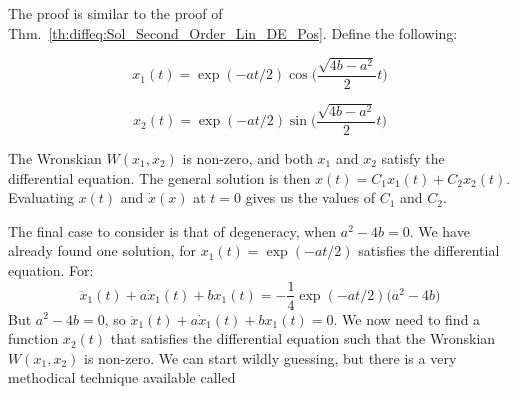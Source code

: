             \begin{bproof}
                The proof is similar to the proof of
                Thm.~\ref{th:diffeq:Sol_Second_Order_Lin_DE_Pos}.
                Define the following:
                \par
                \vspace{-1ex}
                \begin{minipage}{0.49\textwidth}
                    \begin{equation*}
                        x_{1}(t)=\exp(-at/2)
                        \cos\Big(\frac{\sqrt{4b-a^{2}}}{2}t\Big)
                    \end{equation*}
                \end{minipage}
                \hfill
                \begin{minipage}{0.49\textwidth}
                    \begin{equation*}
                        x_{2}(t)=\exp(-at/2)
                        \sin\Big(\frac{\sqrt{4b-a^{2}}}{2}t\Big)
                    \end{equation*}
                \end{minipage}
                \par\hfill\par
                The Wronskian $W(x_{1},x_{2})$ is non-zero, and
                both $x_{1}$ and $x_{2}$ satisfy the
                differential equation. The general solution is then
                $x(t)=C_{1}x_{1}(t)+C_{2}x_{2}(t)$. Evaluating
                $x(t)$ and $\dot{x}(x)$ at $t=0$ gives us the
                values of $C_{1}$ and $C_{2}$.
            \end{bproof}
            The final case to consider is that of degeneracy,
            when $a^{2}-4b=0$.
            We have already found one solution, for
            $x_{1}(t)=\exp(-at/2)$ satisfies the differential
            equation. For:
            \begin{equation}
                \ddot{x}_{1}(t)+a\dot{x}_{1}(t)+bx_{1}(t)
                =-\frac{1}{4}\exp(-at/2)\big(a^{2}-4b\big)
            \end{equation}
            But $a^{2}-4b=0$, so
            $\ddot{x}_{1}(t)+a\dot{x}_{1}(t)+bx_{1}(t)=0$.
            We now need to find a function $x_{2}(t)$ that
            satisfies the differential equation such that
            the Wronskian $W(x_{1},x_{2})$ is non-zero. We can
            start wildly guessing, but there is a very
            methodical technique available called

